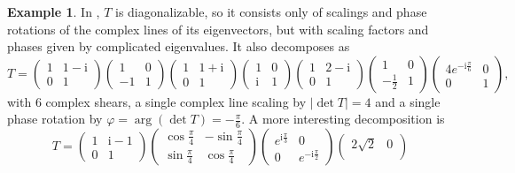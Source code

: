 \documentclass{birkjour}
\theoremstyle{definition}
\newtheorem{example}[theorem]{Example}
\def\im	 					{\mathrm{i}}				%
\begin{document}
\begin{example}
	In ,
	$T$ is diagonalizable, so it consists only of scalings and phase rotations of the complex lines of its eigenvectors,
	but with scaling factors and phases given by complicated eigenvalues.
	It also decomposes as
	\begin{equation*}
		T = \begin{pmatrix}
			1 & 1-\im \\
			0 & 1
		\end{pmatrix}\!\!
		\begin{pmatrix}
			1 & 0 \\
			-1 & 1
		\end{pmatrix}\!\!
		\begin{pmatrix}
			1 & 1+\im \\
			0 & 1
		\end{pmatrix}\!\!
		\begin{pmatrix}
			1 & 0 \\
			\im & 1
		\end{pmatrix}\!\!
		\begin{pmatrix}
			1 & 2-\im \\
			0 & 1
		\end{pmatrix}\!\!
		\begin{pmatrix}
			1 & 0 \\
			-\frac12 & 1
		\end{pmatrix}\!\! 
		\begin{pmatrix}
			4 e^{-\im \frac{\pi}{6}} & 0 \\
			0 & 1
		\end{pmatrix},
	\end{equation*}	
	with 6 complex shears, a single complex line scaling by $|\det T|=4$ and a single phase rotation by $\varphi = \arg(\det T) = -\frac{\pi}{6}$.
	A more interesting decomposition is
	\begin{equation}\label{eq:T}
		T =
		\begin{pmatrix}
			1 & \im-1 \\
			0 & 1
		\end{pmatrix}
		\begin{pmatrix}
			\cos \frac\pi4 & -\sin \frac\pi4 \\
			\sin \frac\pi4 & \cos \frac\pi4
		\end{pmatrix}
		\begin{pmatrix}
			e^{\im\frac{\pi}{3}} & 0 \\
			0 & e^{-\im\frac{\pi}{2}}
		\end{pmatrix}
		\begin{pmatrix}
			2\sqrt{2} & 0 \\

\end{pmatrix}
\end{equation}
\end{example}
\end{document}
